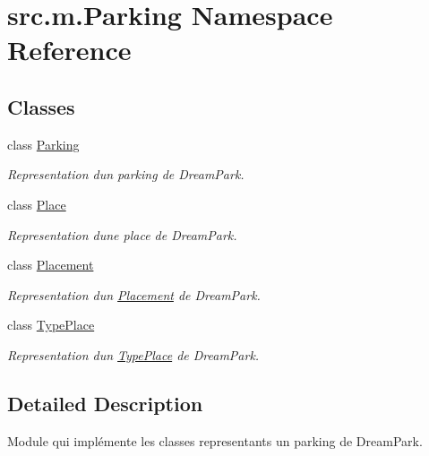 \hypertarget{namespacesrc_1_1m_1_1_parking}{}\section{src.\+m.\+Parking Namespace Reference}
\label{namespacesrc_1_1m_1_1_parking}
\subsection*{Classes}
\begin{DoxyCompactItemize}
\item 
class \hyperlink{classsrc_1_1m_1_1_parking_1_1_parking}{Parking}
\begin{DoxyCompactList}\small\item\em Representation d\textquotesingle{}un parking de Dream\+Park. \end{DoxyCompactList}\item 
class \hyperlink{classsrc_1_1m_1_1_parking_1_1_place}{Place}
\begin{DoxyCompactList}\small\item\em Representation d\textquotesingle{}une place de Dream\+Park. \end{DoxyCompactList}\item 
class \hyperlink{classsrc_1_1m_1_1_parking_1_1_placement}{Placement}
\begin{DoxyCompactList}\small\item\em Representation d\textquotesingle{}un \hyperlink{classsrc_1_1m_1_1_parking_1_1_placement}{Placement} de Dream\+Park. \end{DoxyCompactList}\item 
class \hyperlink{classsrc_1_1m_1_1_parking_1_1_type_place}{Type\+Place}
\begin{DoxyCompactList}\small\item\em Representation d\textquotesingle{}un \hyperlink{classsrc_1_1m_1_1_parking_1_1_type_place}{Type\+Place} de Dream\+Park. \end{DoxyCompactList}\end{DoxyCompactItemize}


\subsection{Detailed Description}
\begin{DoxyVerb}    Module qui implémente les classes representants un parking de DreamPark.
\end{DoxyVerb}
 